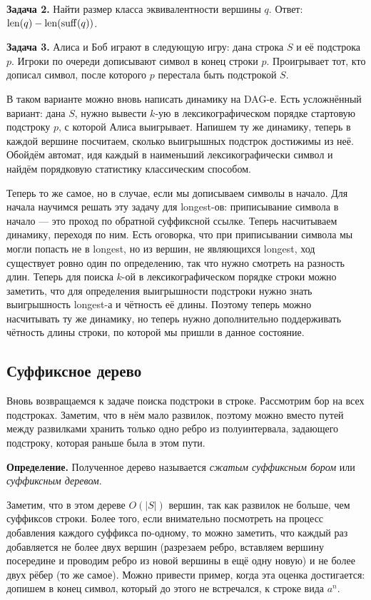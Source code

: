 \textbf{Задача 2.} Найти размер класса эквивалентности вершины $q$. Ответ: $\operatorname{len}(q) - \operatorname{len}(\operatorname{suff}(q))$.

\textbf{Задача 3.} Алиса и Боб играют в следующую игру: дана строка $S$ и её подстрока $p$.
Игроки по очереди дописывают символ в конец строки $p$.
Проигрывает тот, кто дописал символ, после которого $p$ перестала быть подстрокой $S$.

В таком варианте можно вновь написать динамику на DAG-е.
Есть усложнённый вариант: дана $S$, нужно вывести $k$-ую в лексикографическом порядке стартовую подстроку $p$, с которой Алиса выигрывает.
Напишем ту же динамику, теперь в каждой вершине посчитаем, сколько выигрышных подстрок достижимы из неё.
Обойдём автомат, идя каждый в наименьший лексикографически символ и найдём порядковую статистику классическим способом.

Теперь то же самое, но в случае, если мы дописываем символы в начало.
Для начала научимся решать эту задачу для longest-ов: приписывание символа в начало --- это проход по обратной суффиксной ссылке.
Теперь насчитываем динамику, переходя по ним.
Есть оговорка, что при приписывании символа мы могли попасть не в longest, но из вершин, не являющихся longest, ход существует ровно один по определению, так что нужно смотреть на разность длин.
Теперь для поиска $k$-ой в лексикографическом порядке строки можно заметить, что для определения выигрышности подстроки нужно знать выигрышность longest-а и чётность её длины.
Поэтому теперь можно насчитывать ту же динамику, но теперь нужно дополнительно поддерживать чётность длины строки, по которой мы пришли в данное состояние.

\subsection{Суффиксное дерево}
Вновь возвращаемся к задаче поиска подстроки в строке.
Рассмотрим бор на всех подстроках. Заметим, что в нём мало развилок, поэтому можно вместо путей между развилками хранить только одно ребро из полуинтервала, задающего подстроку, которая раньше была в этом пути.

\textbf{Определение.} Полученное дерево называется \textit{сжатым суффиксным бором} или \textit{суффиксным деревом}.

Заметим, что в этом дереве $O(|S|)$ вершин, так как развилок не больше, чем суффиксов строки.
Более того, если внимательно посмотреть на процесс добавления каждого суффикса по-одному, то можно заметить, что каждый раз добавляется не более двух вершин (разрезаем ребро, вставляем вершину посередине и проводим ребро из новой вершины в ещё одну новую) и не более двух рёбер (то же самое).
Можно привести пример, когда эта оценка достигается: допишем в конец символ, который до этого не встречался, к строке вида $a^n$.


